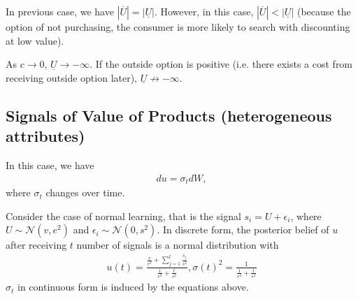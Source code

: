 \documentclass[11pt]{elegantbook}
\begin{document}
In previous case, we have $|\overline{U}|=|\underline{U}|$. However, in this case, $|\overline{U}|<|\underline{U}|$ (because the option of not purchasing, the consumer is more likely to search with discounting at low value).

As $c \rightarrow 0$, $\underline{U} \rightarrow -\infty$. If the outside option is positive (i.e. there exists a cost from receiving outside option later), $\underline{U} \nrightarrow -\infty$.

\subsection{Signals of Value of Products (heterogeneous attributes)}
In this case, we have
\begin{equation}
    \begin{aligned}
        d u = \sigma_t dW,
    \end{aligned}
    \nonumber
\end{equation}
where $\sigma_t$ changes over time.

Consider the case of normal learning, that is the signal $s_i=U+\epsilon_i$, where $U\sim \mathcal{N}\left(v,e^2\right)$ and $\epsilon_i\sim \mathcal{N}\left(0,s^2\right)$. In discrete form, the posterior belief of $u$ after receiving $t$ number of signals is a normal distribution with
\begin{equation}
    \begin{aligned}
        u(t)=\frac{\frac{v}{e^2}+\sum_{j=1}^t\frac{s_j}{s^2}}{\frac{1}{e^2}+\frac{t}{s^2}}, \sigma(t)^2=\frac{1}{\frac{1}{e^2}+\frac{t}{s^2}}
    \end{aligned}
    \nonumber
\end{equation}
$\sigma_t$ in continuous form is induced by the equations above.
\end{document}
